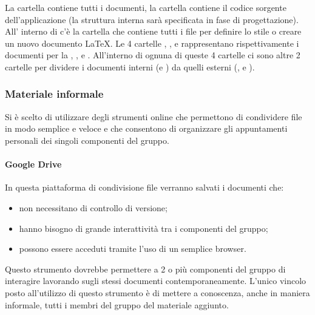 \documentclass[12pt,a4paper]{article}
\begin{document}
La cartella  contiene tutti i documenti, la cartella  contiene il codice sorgente dell'applicazione (la struttura interna sarà specificata in fase di progettazione). All' interno di  c'è la cartella  che contiene tutti i file per definire lo stile o creare un nuovo documento \LaTeX{}. Le 4 cartelle , ,  e  rappresentano rispettivamente i documenti per la \RR, \RP, \RQ e \RA. All'interno di ognuna di queste 4 cartelle ci sono altre 2 cartelle per dividere i documenti interni (\NdP e \SdF) da quelli esterni (\AdR, \PdP e \PdQ).

\subsubsection{Materiale informale}\label{sec:matinf}
Si è scelto di utilizzare degli strumenti online che permettono di condividere file in modo semplice e veloce e che consentono di organizzare gli appuntamenti personali dei singoli componenti del gruppo.

\paragraph{Google Drive}
In questa piattaforma di condivisione file verranno salvati i documenti che:
\begin{itemize}
	\item non necessitano di controllo di versione;
	\item hanno bisogno di grande interattività tra i componenti del gruppo;
	\item possono essere acceduti tramite l’uso di un semplice browser.
\end{itemize}

Questo strumento dovrebbe permettere a 2 o più componenti del gruppo di interagire lavorando sugli stessi documenti contemporaneamente.
L'unico vincolo posto all'utilizzo di questo strumento è di mettere a conoscenza, anche in maniera informale, tutti i membri del gruppo del materiale aggiunto.

\end{document}
